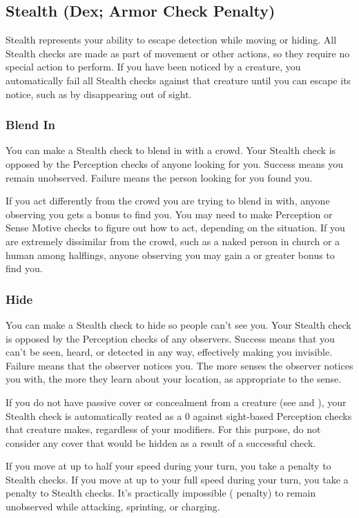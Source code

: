 \subsection{Stealth (Dex; Armor Check Penalty)}\label{Stealth}
Stealth represents your ability to escape detection while moving or hiding. All Stealth checks are made as part of movement or other actions, so they require no special action to perform. If you have been noticed by a creature, you automatically fail all Stealth checks against that creature until you can escape its notice, such as by disappearing out of sight.

\subsubsection{Blend In}
You can make a Stealth check to blend in with a crowd. Your Stealth check is opposed by the Perception checks of anyone looking for you. Success means you remain unobserved. Failure means the person looking for you found you.

If you act differently from the crowd you are trying to blend in with, anyone observing you gets a  bonus to find you. You may need to make Perception or Sense Motive checks to figure out how to act, depending on the situation. If you are extremely dissimilar from the crowd, such as a naked person in church or a human among halflings, anyone observing you may gain a  or greater bonus to find you. 

\subsubsection{Hide}
You can make a Stealth check to hide so people can't see you. Your Stealth check is opposed by the Perception checks of any observers. Success means that you can't be seen, heard, or detected in any way, effectively making you invisible. Failure means that the observer notices you. The more senses the observer notices you with, the more they learn about your location, as appropriate to the sense. 

If you do not have passive cover or concealment from a creature (see  and ), your Stealth check is automatically reated as a 0 against sight-based Perception checks that creature makes, regardless of your modifiers. For this purpose, do not consider any cover that would be hidden as a result of a successful check.

If you move at up to half your speed during your turn, you take a  penalty to Stealth checks. If you move at up to your full speed during your turn, you take a  penalty to Stealth checks. It's practically impossible ( penalty) to remain unobserved while attacking, sprinting, or charging.

